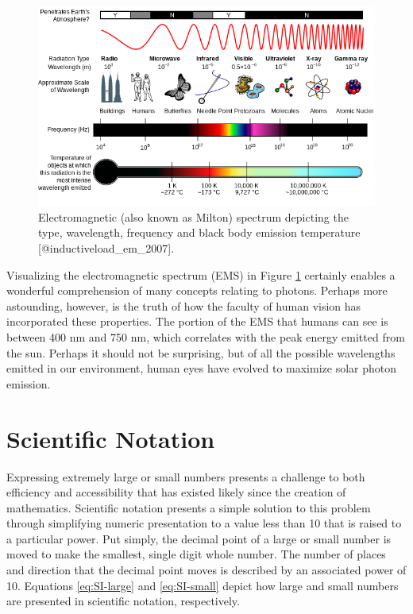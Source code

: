 \documentclass[
]{book}
\begin{document}
\begin{figure}
\includegraphics[width=2\linewidth]{images/11-EMS} \caption{Electromagnetic (also known as Milton) spectrum depicting the type, wavelength, frequency and black body emission temperature [@inductiveload_em_2007].}\label{fig:11-EMS}
\end{figure}

Visualizing the electromagnetic spectrum (EMS) in Figure \ref{fig:11-EMS} certainly enables a wonderful comprehension of many concepts relating to photons. Perhaps more astounding, however, is the truth of how the faculty of human vision has incorporated these properties. The portion of the EMS that humans can see is between 400 nm and 750 nm, which correlates with the peak energy emitted from the sun. Perhaps it should not be surprising, but of all the possible wavelengths emitted in our environment, human eyes have evolved to maximize solar photon emission.

\section{Scientific Notation}\label{scientific-notation}

Expressing extremely large or small numbers presents a challenge to both efficiency and accessibility that has existed likely since the creation of mathematics. Scientific notation presents a simple solution to this problem through simplifying numeric presentation to a value less than 10 that is raised to a particular power. Put simply, the decimal point of a large or small number is moved to make the smallest, single digit whole number. The number of places and direction that the decimal point moves is described by an associated power of 10. Equations \eqref{eq:SI-large} and \eqref{eq:SI-small} depict how large and small numbers are presented in scientific notation, respectively.
\end{document}
